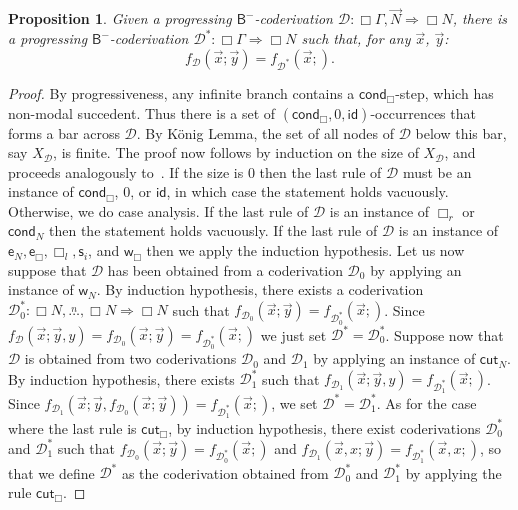 \documentclass[manuscript,screen]{acmart}
\newtheorem{prop}[thm]{Proposition}
\theoremstyle{definition}
\theoremstyle{remark}
\newcommand{\n}{N}
\newcommand{\sq}{\Box}
\newcommand{\sqn}{{\sq\n}}
\newcommand{\sn}{\sqn}
\newcommand{\lists}[3]{{#2},\overset{#1}{\ldots},{#3} }
\renewcommand{\succ}[1]{\mathsf{s}_{#1}}
\newcommand{\cnd}{\mathsf{cond}}
\newcommand{\model}[1]{\denot{#1}}
\newcommand{\denot}[1]{f_{#1}}
\newcommand{\bc}{\mathsf{B}}
\newcommand{\bcnorec}{\bc^{-}}
\newcommand{\seqar}{\Rightarrow}
\newcommand{\der}{\mathcal{D}}
\newcommand{\pder}[1]{\der_{#1}}
\newcommand{\id}{\mathsf{id}}
\newcommand{\wk}{\mathsf{w}}
\newcommand{\exch}{\mathsf{e}}
\newcommand{\cut}{\mathsf{cut}}
\newcommand{\boxlef}{\sq_l}
\newcommand{\boxrig}{\sq_r}
\newcommand{\sql}{\boxlef}
\newcommand{\sqr}{\boxrig}
\begin{document}
\begin{prop} \label{prop:cutbox} Given a progressing  $\bcnorec$-coderivation  $\der: \sq \Gamma , \vec \n \seqar \sn$, there is a progressing  $\bcnorec$-coderivation $\der^*:\sq\Gamma \seqar \sn$   such that, for any $\vec x$, $\vec y$:
\begin{equation*}
    \model{\der}(\vec{x}; \vec{y})= \model{\der^*}(\vec{x};).
\end{equation*}
\end{prop}
\begin{proof} By progressiveness, any infinite branch contains a $\cnd_\sq$-step, which has non-modal succedent. 
Thus there is a set of $(\cnd_{\sq}, 0, \id)$-occurrences  that forms a bar across $\der$.
By K\"{o}nig Lemma, the set of all nodes of $\der$ below this bar, say $X_\der$, is finite. The proof now follows by induction on the size of $X_\der$, and proceeds analogously to~. If the size is $0$ then the last rule of $\der$ must be an instance of $\cnd_{\sq}$, $0$, or $\id$, in which case the statement holds vacuously. Otherwise, we do case analysis. If the last rule of $\der$ is an instance of $\sqr$ or $\cnd_{\n}$ then the statement holds vacuously. If  the last rule of $\der$ is an instance of $\exch_{\n},\exch_{\sq},  \sql,\succ i$, and $\wk_\sq$ then we apply the induction hypothesis. Let us now suppose that $\der$ has been obtained from a coderivation $\der_0$ by applying an instance of  $\wk_\n$. By induction hypothesis, there exists a coderivation  $\pder0^*:\lists{n}{\sn}{\sn} \seqar \sn$ such that $\model{\pder0}(\vec x; \vec y)= \model{\pder0^*}(\vec x; )$. Since $\model{\der}(\vec x; \vec y, y)= \model{\pder0}(\vec x; \vec y)=\model{\pder0^*}(\vec x; )$ we just set $\der^*= \pder{0}^*$.  Suppose now that $\der$ is obtained from two coderivations $\der_0$ and $\der_1$ by applying an instance of  $\cut_\n$. By induction hypothesis, there exists $\pder{1}^*$ such that $\model{\pder{1}}(\vec x;\vec y,y)=\model{\pder{1}^*}(\vec x;)$. Since 
 $\model{\pder{1}}(\vec x; \vec y,  \model{\pder{0}}(\vec x; \vec y))= \model{\pder{1}^*}(\vec x;)$, we set $\der^*=\pder{1}^*$. As for the case where the last rule is $\cut_\sq$, by induction hypothesis, there exist coderivations $\pder{0}^*$ and $\pder{1}^*$ such that $\model{\pder{0}}(\vec x; \vec y)= \model{\pder{0}^*}(\vec x;)$ and $\model{\pder{1}}(\vec x,x; \vec y)= \model{\pder{1}^*}(\vec x, x;)$, so that we define $\der^*$ as the coderivation obtained from $\pder{0}^*$ and $\pder{1}^*$ by applying the rule $\cut_{\sq}$.
\end{proof}
\end{document}

